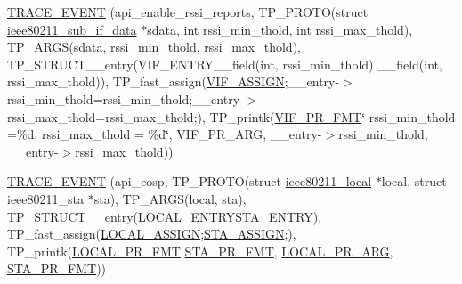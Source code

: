 \begin{DoxyCompactItemize}
\item 
\hyperlink{driver-trace_8h_a127024ae0810a79a83c49b8a87db4e2c}{T\-R\-A\-C\-E\-\_\-\-E\-V\-E\-N\-T} (api\-\_\-enable\-\_\-rssi\-\_\-reports, T\-P\-\_\-\-P\-R\-O\-T\-O(struct \hyperlink{structieee80211__sub__if__data}{ieee80211\-\_\-sub\-\_\-if\-\_\-data} $\ast$sdata, int rssi\-\_\-min\-\_\-thold, int rssi\-\_\-max\-\_\-thold), T\-P\-\_\-\-A\-R\-G\-S(sdata, rssi\-\_\-min\-\_\-thold, rssi\-\_\-max\-\_\-thold), T\-P\-\_\-\-S\-T\-R\-U\-C\-T\-\_\-\-\_\-entry(V\-I\-F\-\_\-\-E\-N\-T\-R\-Y\-\_\-\-\_\-field(int, rssi\-\_\-min\-\_\-thold) \-\_\-\-\_\-field(int, rssi\-\_\-max\-\_\-thold)), T\-P\-\_\-fast\-\_\-assign(\hyperlink{driver-trace_8h_af5ede80f04ffcb3f644f68837b1d252c}{V\-I\-F\-\_\-\-A\-S\-S\-I\-G\-N};\-\_\-\-\_\-entry-\/$>$rssi\-\_\-min\-\_\-thold=rssi\-\_\-min\-\_\-thold;\-\_\-\-\_\-entry-\/$>$rssi\-\_\-max\-\_\-thold=rssi\-\_\-max\-\_\-thold;), T\-P\-\_\-printk(\hyperlink{driver-trace_8h_a50711161ccfc99a73b43b988149a61a5}{V\-I\-F\-\_\-\-P\-R\-\_\-\-F\-M\-T}\char`\"{} rssi\-\_\-min\-\_\-thold =\%d, rssi\-\_\-max\-\_\-thold = \%d\char`\"{}, V\-I\-F\-\_\-\-P\-R\-\_\-\-A\-R\-G, \-\_\-\-\_\-entry-\/$>$rssi\-\_\-min\-\_\-thold, \-\_\-\-\_\-entry-\/$>$rssi\-\_\-max\-\_\-thold))
\item 
\hyperlink{driver-trace_8h_a0a6fb63e81d42767a656a27c5ebb7b0d}{T\-R\-A\-C\-E\-\_\-\-E\-V\-E\-N\-T} (api\-\_\-eosp, T\-P\-\_\-\-P\-R\-O\-T\-O(struct \hyperlink{structieee80211__local}{ieee80211\-\_\-local} $\ast$local, struct ieee80211\-\_\-sta $\ast$sta), T\-P\-\_\-\-A\-R\-G\-S(local, sta), T\-P\-\_\-\-S\-T\-R\-U\-C\-T\-\_\-\-\_\-entry(L\-O\-C\-A\-L\-\_\-\-E\-N\-T\-R\-Y\-S\-T\-A\-\_\-\-E\-N\-T\-R\-Y), T\-P\-\_\-fast\-\_\-assign(\hyperlink{driver-trace_8h_ab19d9141887ea92ef9640df06a51e0a1}{L\-O\-C\-A\-L\-\_\-\-A\-S\-S\-I\-G\-N};\hyperlink{driver-trace_8h_abbd837b5fc444c0cb48b5954f8ad068a}{S\-T\-A\-\_\-\-A\-S\-S\-I\-G\-N};), T\-P\-\_\-printk(\hyperlink{driver-trace_8h_a09833af423135e21ffe99a59ae088cf1}{L\-O\-C\-A\-L\-\_\-\-P\-R\-\_\-\-F\-M\-T} \hyperlink{driver-trace_8h_a73d0cd445b999888e3f21698b769c843}{S\-T\-A\-\_\-\-P\-R\-\_\-\-F\-M\-T}, \hyperlink{driver-trace_8h_aa2a77a17621ecb4f0b3926fec90a5538}{L\-O\-C\-A\-L\-\_\-\-P\-R\-\_\-\-A\-R\-G}, \hyperlink{driver-trace_8h_a73d0cd445b999888e3f21698b769c843}{S\-T\-A\-\_\-\-P\-R\-\_\-\-F\-M\-T}))
\item 

\end{DoxyCompactItemize}
